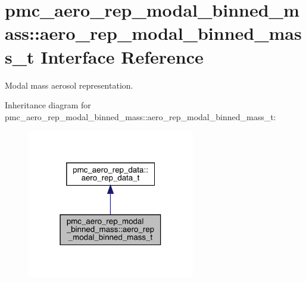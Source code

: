 \hypertarget{structpmc__aero__rep__modal__binned__mass_1_1aero__rep__modal__binned__mass__t}{}\section{pmc\+\_\+aero\+\_\+rep\+\_\+modal\+\_\+binned\+\_\+mass\+:\+:aero\+\_\+rep\+\_\+modal\+\_\+binned\+\_\+mass\+\_\+t Interface Reference}
\label{structpmc__aero__rep__modal__binned__mass_1_1aero__rep__modal__binned__mass__t}


Modal mass aerosol representation.  




Inheritance diagram for pmc\+\_\+aero\+\_\+rep\+\_\+modal\+\_\+binned\+\_\+mass\+:\+:aero\+\_\+rep\+\_\+modal\+\_\+binned\+\_\+mass\+\_\+t\+:\nopagebreak
\begin{figure}[H]
\begin{center}
\leavevmode
\includegraphics[width=207pt]{structpmc__aero__rep__modal__binned__mass_1_1aero__rep__modal__binned__mass__t__inherit__graph}
\end{center}
\end{figure}
